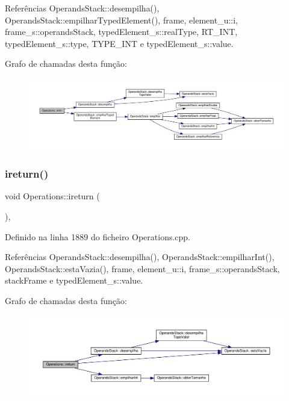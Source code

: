 Referências Operands\+Stack\+::desempilha(), Operands\+Stack\+::empilhar\+Typed\+Element(), frame, element\+\_\+u\+::i, frame\+\_\+s\+::operands\+Stack, typed\+Element\+\_\+s\+::real\+Type, R\+T\+\_\+\+I\+NT, typed\+Element\+\_\+s\+::type, T\+Y\+P\+E\+\_\+\+I\+NT e typed\+Element\+\_\+s\+::value.

Grafo de chamadas desta função\+:
\nopagebreak
\begin{figure}[H]
\begin{center}
\leavevmode
\includegraphics[width=350pt]{classOperations_a510bd2d155695861597a4413b44565bc_cgraph}
\end{center}
\end{figure}
\mbox{\label{classOperations_a4be12fb7c8eeee8a2f6489ec27a46dce}} 
\subsubsection{\texorpdfstring{ireturn()}{ireturn()}}
{\footnotesize\ttfamily void Operations\+::ireturn (\begin{DoxyParamCaption}{ }\end{DoxyParamCaption})\hspace{0.3cm}{\ttfamily [static]}, {\ttfamily [private]}}



Definido na linha 1889 do ficheiro Operations.\+cpp.



Referências Operands\+Stack\+::desempilha(), Operands\+Stack\+::empilhar\+Int(), Operands\+Stack\+::esta\+Vazia(), frame, element\+\_\+u\+::i, frame\+\_\+s\+::operands\+Stack, stack\+Frame e typed\+Element\+\_\+s\+::value.

Grafo de chamadas desta função\+:
\nopagebreak
\begin{figure}[H]
\begin{center}
\leavevmode
\includegraphics[width=350pt]{classOperations_a4be12fb7c8eeee8a2f6489ec27a46dce_cgraph}
\end{center}
\end{figure}
\mbox{\label{classOperations_a3139bbe41519fb4761ecd7e2a8ddb994}} 

